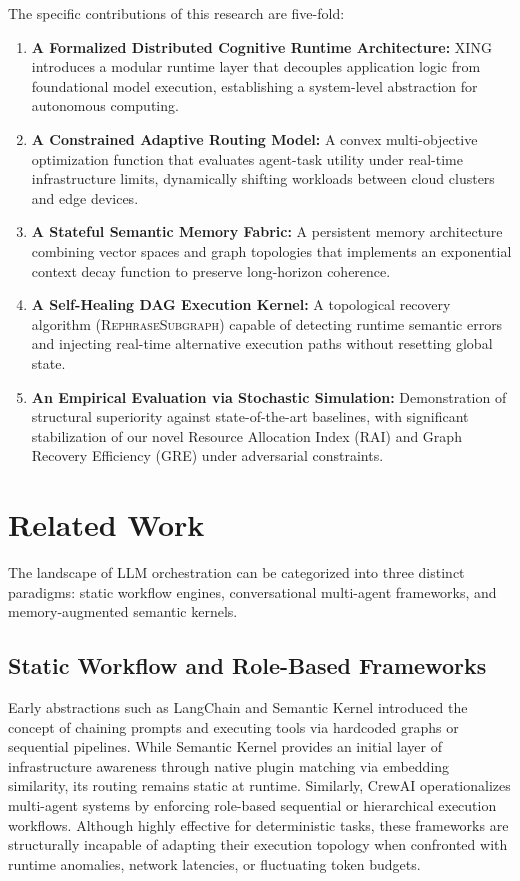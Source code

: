 \documentclass[conference]{IEEEtran}
\begin{document}
The specific contributions of this research are five-fold:
\begin{enumerate}
    \item \textbf{A Formalized Distributed Cognitive Runtime Architecture:} XING introduces a modular runtime layer that decouples application logic from foundational model execution, establishing a system-level abstraction for autonomous computing.
    \item \textbf{A Constrained Adaptive Routing Model:} A convex multi-objective optimization function that evaluates agent-task utility under real-time infrastructure limits, dynamically shifting workloads between cloud clusters and edge devices.
    \item \textbf{A Stateful Semantic Memory Fabric:} A persistent memory architecture combining vector spaces and graph topologies that implements an exponential context decay function to preserve long-horizon coherence.
    \item \textbf{A Self-Healing DAG Execution Kernel:} A topological recovery algorithm (\textsc{RephraseSubgraph}) capable of detecting runtime semantic errors and injecting real-time alternative execution paths without resetting global state.
    \item \textbf{An Empirical Evaluation via Stochastic Simulation:} Demonstration of structural superiority against state-of-the-art baselines, with significant stabilization of our novel Resource Allocation Index (RAI) and Graph Recovery Efficiency (GRE) under adversarial constraints.
\end{enumerate}

\section{Related Work}

The landscape of LLM orchestration can be categorized into three distinct paradigms: static workflow engines, conversational multi-agent frameworks, and memory-augmented semantic kernels.

\subsection{Static Workflow and Role-Based Frameworks}

Early abstractions such as LangChain \cite{langchain2023} and Semantic Kernel \cite{semantic_kernel2024} introduced the concept of chaining prompts and executing tools via hardcoded graphs or sequential pipelines. While Semantic Kernel provides an initial layer of infrastructure awareness through native plugin matching via embedding similarity, its routing remains static at runtime. Similarly, CrewAI \cite{crewai2023} operationalizes multi-agent systems by enforcing role-based sequential or hierarchical execution workflows. Although highly effective for deterministic tasks, these frameworks are structurally incapable of adapting their execution topology when confronted with runtime anomalies, network latencies, or fluctuating token budgets.
\end{document}
